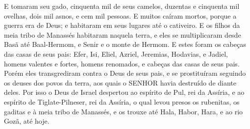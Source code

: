 {  E tomaram seu gado, cinquenta mil de seus camelos, duzentas e cinquenta mil ovelhas, dois mil asnos, e cem mil pessoas.
  E muitos caíram mortos, porque a guerra era de Deus; e habitaram em seus lugares até o cativeiro.
  E os filhos da meia tribo de Manassés habitaram naquela terra, e eles se multiplicaram desde Basã até Baal-Hermom, e Senir e o monte de Hermom.
  E estes foram os cabeças das casas de seus pais: Efer, Isi, Eliel, Azriel, Jeremias, Hodavias, e Jadiel, homens valentes e fortes, homens renomados, e cabeças das casas de seus pais.
  Porém eles transgrediram contra o Deus de seus pais, e se prostituíram seguindo os deuses dos povos da terra, aos quais o SENHOR havia destruído de diante deles.
  Por isso o Deus de Israel despertou ao espírito de Pul, rei da Assíria, e ao espírito de Tiglate-Pilneser, rei da Assíria, o qual levou presos os rubenitas, os gaditas e à meia tribo de Manassés, e os trouxe até Hala, Habor, Hara, e ao rio Gozã, até hoje.
\par }

